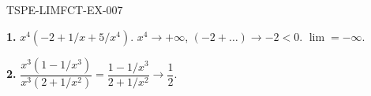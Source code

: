 \begin{corrige}{TSPE-LIMFCT-EX-007}

\textbf{1.} $x^4(-2 + 1/x + 5/x^4)$. $x^4 \to +\infty$, $(-2 + \ldots) \to -2 < 0$. $\boxed{\lim = -\infty}$.

\textbf{2.} $\dfrac{x^3(1-1/x^3)}{x^3(2+1/x^2)} = \dfrac{1-1/x^3}{2+1/x^2} \to \boxed{\dfrac{1}{2}}$.

\end{corrige}
